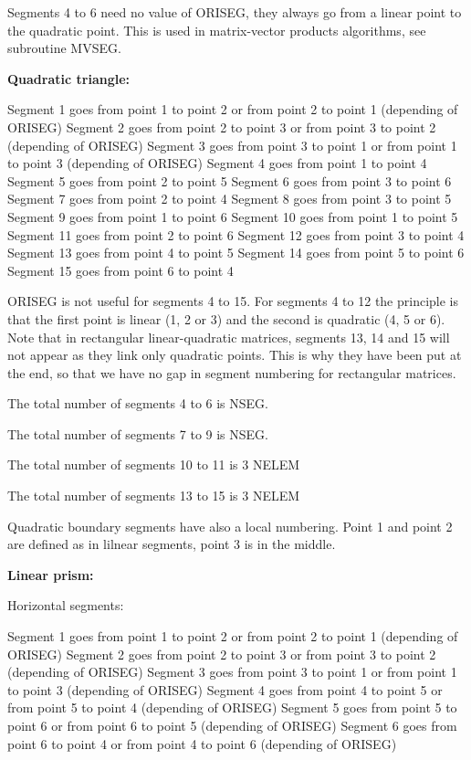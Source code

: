 Segments 4 to 6 need no value of ORISEG, they always go from a linear point to
the quadratic point. This is used in matrix-vector products algorithms, see
subroutine MVSEG.

\textbf{Quadratic triangle:}

Segment 1 goes from point 1 to point 2 or from point 2 to point 1 (depending of ORISEG)
Segment 2 goes from point 2 to point 3 or from point 3 to point 2 (depending of ORISEG)
Segment 3 goes from point 3 to point 1 or from point 1 to point 3 (depending of ORISEG)
Segment 4 goes from point 1 to point 4
Segment 5 goes from point 2 to point 5
Segment 6 goes from point 3 to point 6
Segment 7 goes from point 2 to point 4
Segment 8 goes from point 3 to point 5
Segment 9 goes from point 1 to point 6
Segment 10 goes from point 1 to point 5
Segment 11 goes from point 2 to point 6
Segment 12 goes from point 3 to point 4
Segment 13 goes from point 4 to point 5
Segment 14 goes from point 5 to point 6
Segment 15 goes from point 6 to point 4

ORISEG is not useful for segments 4 to 15. For segments 4 to 12 the principle
is that the first point is linear (1, 2 or 3) and the second is quadratic (4, 5
or 6). Note that in rectangular linear-quadratic matrices, segments 13, 14 and
15 will not appear as they link only quadratic points. This is why they have
been put at the end, so that we have no gap in segment numbering for
rectangular matrices.

The total number of segments 4 to 6 is NSEG.

The total number of segments 7 to 9 is NSEG.

The total number of segments 10 to 11 is 3 NELEM

The total number of segments 13 to 15 is 3 NELEM

Quadratic boundary segments have also a local numbering. Point 1 and point 2
are defined as in lilnear segments, point 3 is in the middle.

\textbf{Linear prism:}

Horizontal segments:

Segment 1 goes from point 1 to point 2 or from point 2 to point 1 (depending of ORISEG)
Segment 2 goes from point 2 to point 3 or from point 3 to point 2 (depending of ORISEG)
Segment 3 goes from point 3 to point 1 or from point 1 to point 3 (depending of ORISEG)
Segment 4 goes from point 4 to point 5 or from point 5 to point 4 (depending of ORISEG)
Segment 5 goes from point 5 to point 6 or from point 6 to point 5 (depending of ORISEG)
Segment 6 goes from point 6 to point 4 or from point 4 to point 6 (depending of ORISEG)

